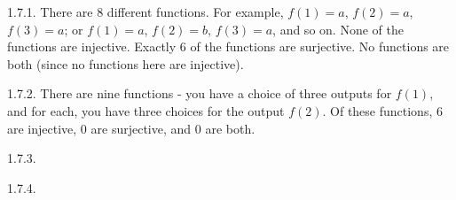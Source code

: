  \protect {} \protect \begin {itemize} 
\begin{ans}{1.7.1.}
	There are 8 different functions.  For example, $f(1) = a$, $f(2) = a$, $f(3) = a$; or $f(1) = a$, $f(2) = b$, $f(3) = a$, and so on.  None of the functions are injective.  Exactly 6 of the functions are surjective.  No functions are both (since no functions here are injective).
	
\end{ans}
\begin{ans}{1.7.2.}
	There are nine functions - you have a choice of three outputs for $f(1)$, and for each, you have three choices for the output $f(2)$.  Of these functions, 6 are injective, 0 are surjective, and 0 are both.
	
\end{ans}
\begin{ans}{1.7.3.}
	
\end{ans}
\begin{ans}{1.7.4.}
	\begin{parts}

\end{parts}
\end{ans}
\end{itemize}
